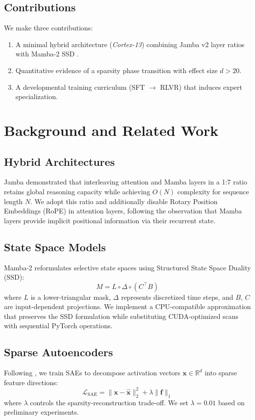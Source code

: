 \documentclass[12pt, a4paper]{article}
\begin{document}
\subsection{Contributions}
We make three contributions:
\begin{enumerate}
    \item A minimal hybrid architecture (\textit{Cortex-13}) combining Jamba v2 layer ratios \cite[Table 1]{AI21Jamba2024} with Mamba-2 SSD \cite[Algorithm 1]{Dao2024Mamba2}.
    \item Quantitative evidence of a sparsity phase transition with effect size $d>20$.
    \item A developmental training curriculum (SFT $\rightarrow$ RLVR) that induces expert specialization.
\end{enumerate}

\section{Background and Related Work}

\subsection{Hybrid Architectures}
Jamba \cite[Section 2.1]{AI21Jamba2024} demonstrated that interleaving attention and Mamba layers in a 1:7 ratio retains global reasoning capacity while achieving $O(N)$ complexity for sequence length $N$. We adopt this ratio and additionally disable Rotary Position Embeddings (RoPE) in attention layers, following the observation that Mamba layers provide implicit positional information via their recurrent state.

\subsection{State Space Models}
Mamba-2 \cite[Section 3]{Dao2024Mamba2} reformulates selective state spaces using Structured State Space Duality (SSD):
\begin{equation}
    M = L \circ \Delta \circ (C^\top B)
    \label{eq:ssd}
\end{equation}
where $L$ is a lower-triangular mask, $\Delta$ represents discretized time steps, and $B$, $C$ are input-dependent projections. We implement a CPU-compatible approximation that preserves the SSD formulation while substituting CUDA-optimized scans with sequential PyTorch operations.

\subsection{Sparse Autoencoders}
Following \cite[Section 2]{Anthropic2024SAE}, we train SAEs to decompose activation vectors $\mathbf{x} \in \mathbb{R}^d$ into sparse feature directions:
\begin{equation}
    \mathcal{L}_{\mathrm{SAE}} = \|\mathbf{x} - \hat{\mathbf{x}}\|^2_2 + \lambda \|\mathbf{f}\|_1
    \label{eq:sae}
\end{equation}
where $\lambda$ controls the sparsity-reconstruction trade-off. We set $\lambda=0.01$ based on preliminary experiments.
\end{document}
